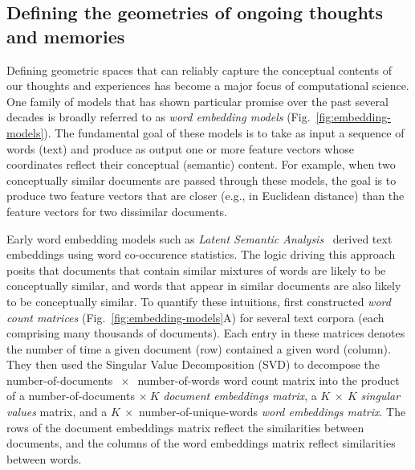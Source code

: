 \documentclass{article}
\begin{document}
\subsection*{Defining the geometries of ongoing thoughts and memories}
Defining geometric spaces that can reliably capture the conceptual contents of our thoughts and experiences has become a major focus of computational science.  One family of models that has shown particular promise over the past several decades is broadly referred to as \textit{word embedding models} (Fig.~\ref{fig:embedding-models}).  The fundamental goal of these models is to take as input a sequence of words (text) and produce as output one or more feature vectors whose coordinates reflect their conceptual (semantic) content.  For example, when two conceptually similar documents are passed through these models, the goal is to produce two feature vectors that are closer (e.g., in Euclidean distance) than the feature vectors for two dissimilar documents.

Early word embedding models such as \textit{Latent Semantic Analysis}~\citep[LSA;][]{DeerEtal90, LandDuma97} derived text embeddings using word co-occurence statistics.  The logic driving this approach posits that documents that contain similar mixtures of words are likely to be conceptually similar, and words that appear in similar documents are also likely to be conceptually similar.  To quantify these intuitions, \cite{DeerEtal90} first constructed \textit{word count matrices} (Fig.~\ref{fig:embedding-models}A) for several text corpora (each comprising many thousands of documents).  Each entry in these matrices denotes the number of time a given document (row) contained a given word (column).  They then used the Singular Value Decomposition (SVD) to decompose the number-of-documents $~\times~$ number-of-words word count matrix into the product of a number-of-documents $\times~K$ \textit{document embeddings matrix}, a $K~\times~K$ \textit{singular values} matrix, and a $K~\times$ number-of-unique-words \textit{word embeddings matrix}.  The rows of the document embeddings matrix reflect the similarities between documents, and the columns of the word embeddings matrix reflect similarities between words.
\end{document}
